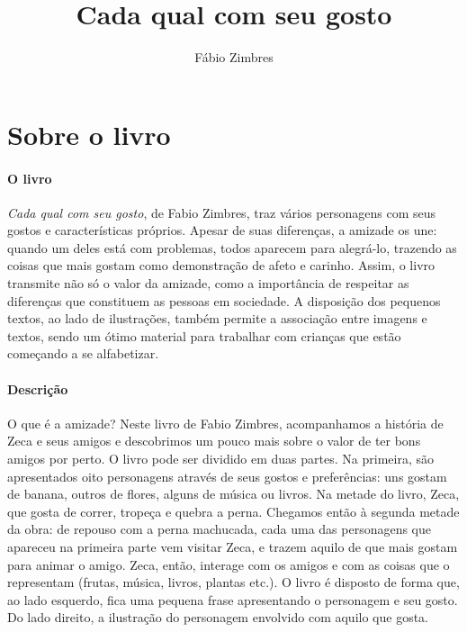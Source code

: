 \documentclass[11pt]{extarticle}
\newcommand{\AutorLivro}{Fábio Zimbres}
\newcommand{\TituloLivro}{Cada qual com seu gosto}
\newcommand{\colaborador}{{Paulo Pompermaier e Renier Silva}}
\begin{document}
\title{\TituloLivro}
\author{\AutorLivro}
\def\authornotes{\colaborador}

\date{}
\maketitle


\tableofcontents



\section{Sobre o livro}

\paragraph{O livro} \textit{Cada qual com seu gosto}, de Fabio Zimbres, traz vários personagens com seus gostos e características próprios. Apesar de suas diferenças, a amizade os une: quando um deles está com problemas, todos aparecem para alegrá-lo, trazendo as coisas que mais gostam como demonstração de afeto e carinho.
Assim, o livro transmite não só o valor da amizade, como a importância de respeitar as diferenças que constituem as pessoas em sociedade.
A disposição dos pequenos textos, ao lado de ilustrações, também permite a associação entre imagens e textos, sendo um ótimo material para trabalhar com crianças que estão começando a se alfabetizar.


\paragraph{Descrição} O que é a amizade? Neste livro de Fabio Zimbres, acompanhamos a história de Zeca e seus amigos e descobrimos um pouco mais sobre o valor de ter bons amigos por perto. O livro pode ser dividido em duas partes. Na primeira, são apresentados oito personagens através de seus gostos e preferências: uns gostam de banana, outros de flores, alguns de música ou livros. Na metade do livro, Zeca, que gosta de correr, tropeça e quebra a perna. Chegamos então à segunda metade da obra: de repouso com a perna machucada, cada uma das personagens que apareceu na primeira parte vem visitar Zeca, e trazem aquilo de que mais gostam para animar o amigo. Zeca, então, interage com os amigos e com as coisas que o representam (frutas, música, livros, plantas etc.). O livro é disposto de forma que, ao lado esquerdo, fica uma pequena frase apresentando o personagem e seu gosto. Do lado direito, a ilustração do personagem envolvido com aquilo que gosta. 
\end{document}
